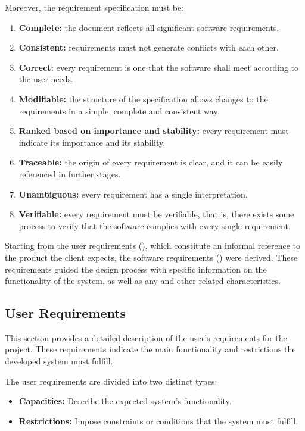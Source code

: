 Moreover, the requirement specification must be:
\begin{enumerate}
  \item \textbf{Complete:} the document reflects all significant software requirements.
  \item \textbf{Consistent:} requirements must not generate conflicts with each other.
  \item \textbf{Correct:} every requirement is one that the software shall meet according to the user needs.
  \item \textbf{Modifiable:} the structure of the specification allows changes to the requirements in a simple, complete and consistent way.
  \item \textbf{Ranked based on importance and stability:} every requirement must indicate its importance and its stability.
  \item \textbf{Traceable:} the origin of every requirement is clear, and it can be easily referenced in further stages.
  \item \textbf{Unambiguous:} every requirement has a single interpretation.
  \item \textbf{Verifiable:} every requirement must be verifiable, that is, there exists some process to verify that the software complies with every single requirement.
\end{enumerate}

Starting from the user requirements (), which constitute an informal reference to the product the client expects, the software requirements () were derived. These requirements guided the design process with specific information on the functionality of the system, as well as any and other related characteristics.



\subsection{User Requirements}\label{subsec:user-requirements}
This section provides a detailed description of the user's requirements for the project. These requirements indicate the main functionality and restrictions the developed system must fulfill.

The user requirements are divided into two distinct types:
\begin{itemize}
  \item \textbf{Capacities:} Describe the expected system's functionality.
  \item \textbf{Restrictions:} Impose constraints or conditions that the system must fulfill.
\end{itemize}


